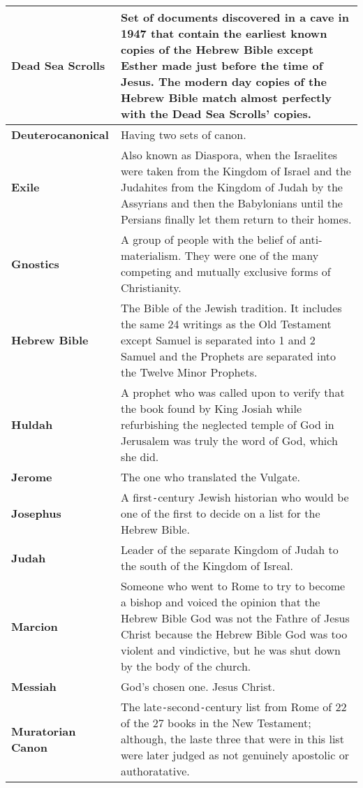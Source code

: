 \documentclass{report}
\begin{document}
\begin{center}
\begin{longtable}{| p{5cm} | p{7cm} |}
            \textbf{Dead Sea Scrolls} & Set of documents discovered in a cave in 1947 that contain the earliest known copies of the Hebrew Bible except Esther made just before the time of Jesus. The modern day copies of the Hebrew Bible match almost perfectly with the Dead Sea Scrolls' copies.\\ \hline
            \textbf{Deuterocanonical} & Having two sets of canon.\\ \hline
            \textbf{Exile} & Also known as Diaspora, when the Israelites were taken from the Kingdom of Israel and the Judahites from the Kingdom of Judah by the Assyrians and then the Babylonians until the Persians finally let them return to their homes.\\ \hline
            \textbf{Gnostics} & A group of people with the belief of anti-materialism. They were one of the many competing and mutually exclusive forms of Christianity.\\ \hline
            \textbf{Hebrew Bible} & The Bible of the Jewish tradition. It includes the same 24 writings as the Old Testament except Samuel is separated into 1 and 2 Samuel and the Prophets are separated into the Twelve Minor Prophets.\\ \hline
            \textbf{Huldah} & A prophet who was called upon to verify that the book found by King Josiah while refurbishing the neglected temple of God in Jerusalem was truly the word of God, which she did.\\ \hline
            \textbf{Jerome} & The one who translated the Vulgate.\\ \hline
            \textbf{Josephus} & A first\texttt{-}century Jewish historian who would be one of the first to decide on a list for the Hebrew Bible.\\ \hline
            \textbf{Judah} & Leader of the separate Kingdom of Judah to the south of the Kingdom of Isreal.\\ \hline
            \textbf{Marcion} & Someone who went to Rome to try to become a bishop and voiced the opinion that the Hebrew Bible God was not the Fathre of Jesus Christ because the Hebrew Bible God was too violent and vindictive, but he was shut down by the body of the church.\\ \hline
            \textbf{Messiah} & God's chosen one. Jesus Christ.\\ \hline
            \textbf{Muratorian Canon} & The late\texttt{-}second\texttt{-}century list from Rome of 22 of the 27 books in the New Testament; although, the laste three that were in this list were later judged as not genuinely apostolic or authoratative.\\ \hline

\end{longtable}
\end{center}
\end{document}

